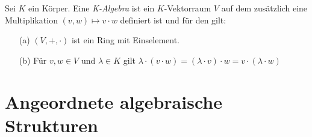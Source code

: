 %
%
%
\begin{defn} %
Sei $K$ ein Körper. Eine \textit{K-Algebra} ist ein $K$-Vektorraum $V$ auf dem zusätzlich eine Multiplikation $\left(v,w\right) \mapsto v\cdot w$ definiert ist und für den gilt:
\begin{itemize}
\item[(a)] $\left(V, +, \cdot\right)$ ist ein Ring mit Einselement.
\item[(b)] Für $v,w \in V$ und $\lambda \in K$ gilt $\lambda\cdot \left(v\cdot w\right) = \left(\lambda \cdot v\right)\cdot w = v\cdot \left(\lambda\cdot w\right)$
\end{itemize}
\end{defn}
%
%
\section{Angeordnete algebraische Strukturen}
